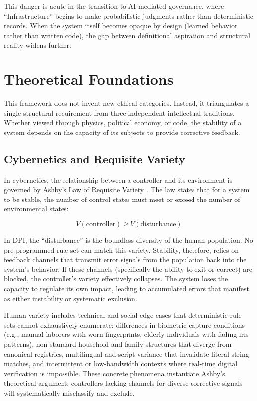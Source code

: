 \documentclass{article}
\begin{document}
This danger is acute in the transition to AI-mediated governance, where ``Infrastructure'' begins to make probabilistic judgments rather than deterministic records. When the system itself becomes opaque by design (learned behavior rather than written code), the gap between definitional aspiration and structural reality widens further.

\section{Theoretical Foundations}
\label{sec:theory}

This framework does not invent new ethical categories. Instead, it triangulates a single structural requirement from three independent intellectual traditions. Whether viewed through physics, political economy, or code, the stability of a system depends on the capacity of its subjects to provide corrective feedback.

\subsection{Cybernetics and Requisite Variety}

In cybernetics, the relationship between a controller and its environment is governed by Ashby's Law of Requisite Variety \citep{ashby1956}. The law states that for a system to be stable, the number of control states must meet or exceed the number of environmental states:

\begin{equation}
V(\text{controller}) \geq V(\text{disturbance})
\label{eq:ashby}
\end{equation}

In DPI, the ``disturbance'' is the boundless diversity of the human population. No pre-programmed rule set can match this variety. Stability, therefore, relies on feedback channels that transmit error signals from the population back into the system's behavior. If these channels (specifically the ability to exit or correct) are blocked, the controller's variety effectively collapses. The system loses the capacity to regulate its own impact, leading to accumulated errors that manifest as either instability or systematic exclusion.

Human variety includes technical and social edge cases that deterministic rule sets cannot exhaustively enumerate: differences in biometric capture conditions (e.g., manual laborers with worn fingerprints, elderly individuals with fading iris patterns), non-standard household and family structures that diverge from canonical registries, multilingual and script variance that invalidate literal string matches, and intermittent or low-bandwidth contexts where real-time digital verification is impossible. These concrete phenomena instantiate Ashby's theoretical argument: controllers lacking channels for diverse corrective signals will systematically misclassify and exclude.
\end{document}
